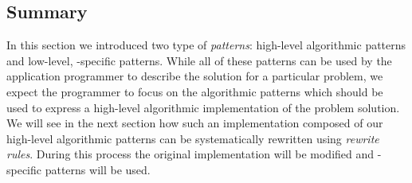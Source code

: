\subsection{Summary}
In this section we introduced two type of \emph{patterns}:
high-level algorithmic patterns and low-level, \OpenCL-specific patterns.
While all of these patterns can be used by the application programmer to describe the solution for a particular problem, we expect the programmer to focus on the algorithmic patterns which should be used to express a high-level algorithmic implementation of the problem solution.
We will see in the next section how such an implementation composed of our high-level algorithmic patterns can be systematically rewritten using \emph{rewrite rules}.
During this process the original implementation will be modified and \OpenCL-specific patterns will be used.


